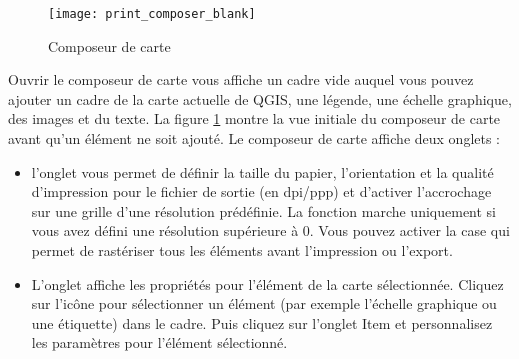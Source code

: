 \begin{figure}[ht]
   \begin{center}
    \caption{Composeur de carte\nixcaption}
\label{fig:print_composer_blank}\smallskip
   \texttt{[image: print\_composer\_blank]}
\end{center}
\end{figure}

Ouvrir le composeur de carte vous affiche un cadre vide auquel vous pouvez ajouter un cadre de la carte actuelle de QGIS, une légende, une échelle
graphique, des images et du texte. La figure \ref{fig:print_composer_blank} montre la vue initiale du composeur de carte avant qu'un élément ne soit ajouté. Le composeur de carte affiche deux onglets :

\begin{itemize}
\item l'onglet  vous permet de définir la taille du papier, l'orientation et la qualité d'impression pour le fichier de sortie (en dpi/ppp) et d'activer l'accrochage sur une grille d'une résolution prédéfinie. La fonction  marche uniquement si vous avez défini une résolution supérieure à 0. Vous pouvez activer la case  qui permet de rastériser tous les éléments avant l'impression ou l'export.
\item L'onglet  affiche les propriétés pour l'élément de la carte sélectionnée. Cliquez sur l'icône   pour sélectionner un élément (par exemple l'échelle graphique ou une étiquette) dans le cadre. Puis cliquez sur l'onglet Item et personnalisez les paramètres pour l'élément sélectionné.
\end{itemize}

